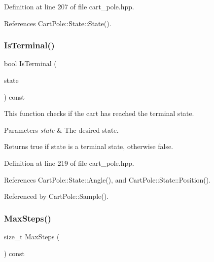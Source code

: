 Definition at line 207 of file cart\+\_\+pole.\+hpp.



References Cart\+Pole\+::\+State\+::\+State().

\mbox{\label{classmlpack_1_1rl_1_1CartPole_a7fd056133dfd315e4bf45c408f99326f}} 
\subsubsection{Is\+Terminal()}
{\footnotesize\ttfamily bool Is\+Terminal (\begin{DoxyParamCaption}\item[{const \textbf{ State} \&}]{state }\end{DoxyParamCaption}) const\hspace{0.3cm}{\ttfamily [inline]}}



This function checks if the cart has reached the terminal state. 


\begin{DoxyParams}{Parameters}
{\em state} & The desired state. \\
\hline
\end{DoxyParams}
\begin{DoxyReturn}{Returns}
true if state is a terminal state, otherwise false. 
\end{DoxyReturn}


Definition at line 219 of file cart\+\_\+pole.\+hpp.



References Cart\+Pole\+::\+State\+::\+Angle(), and Cart\+Pole\+::\+State\+::\+Position().



Referenced by Cart\+Pole\+::\+Sample().

\mbox{\label{classmlpack_1_1rl_1_1CartPole_ad8fd6d8f7581c82e73556491b79a8907}} 
\subsubsection{Max\+Steps()\hspace{0.1cm}{\footnotesize\ttfamily [1/2]}}
{\footnotesize\ttfamily size\+\_\+t Max\+Steps (\begin{DoxyParamCaption}{ }\end{DoxyParamCaption}) const\hspace{0.3cm}{\ttfamily [inline]}}



